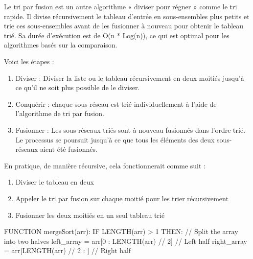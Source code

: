 \documentclass[11pt]{article}
\providecommand{\tightlist}{%
      \setlength{\itemsep}{0pt}\setlength{\parskip}{0pt}}
\begin{document}
Le tri par fusion est un autre algorithme « diviser pour régner » comme
le tri rapide. Il divise récursivement le tableau d'entrée en
sous-ensembles plus petits et trie ces sous-ensembles avant de les
fusionner à nouveau pour obtenir le tableau trié. Sa durée d'exécution
est de O(n * Log(n)), ce qui est optimal pour les algorithmes basés sur
la comparaison.

Voici les étapes :

\begin{enumerate}
\def\labelenumi{\arabic{enumi}.}
\tightlist
\item
  Diviser : Diviser la liste ou le tableau récursivement en deux moitiés
  jusqu'à ce qu'il ne soit plus possible de le diviser.
\item
  Conquérir : chaque sous-réseau est trié individuellement à l'aide de
  l'algorithme de tri par fusion.
\item
  Fusionner : Les sous-réseaux triés sont à nouveau fusionnés dans
  l'ordre trié. Le processus se poursuit jusqu'à ce que tous les
  éléments des deux sous-réseaux aient été fusionnés.
\end{enumerate}

En pratique, de manière récursive, cela fonctionnerait comme suit :

\begin{enumerate}
\def\labelenumi{\arabic{enumi}.}
\tightlist
\item
  Diviser le tableau en deux
\item
  Appeler le tri par fusion sur chaque moitié pour les trier
  récursivement
\item
  Fusionner les deux moitiés en un seul tableau trié
\end{enumerate}

    FUNCTION mergeSort(arr): IF LENGTH(arr) \textgreater{} 1 THEN: // Split
the array into two halves left\_array = arr{[}0 : LENGTH(arr) // 2{]} //
Left half right\_array = arr{[}LENGTH(arr) // 2 : {]} // Right half
\end{document}
